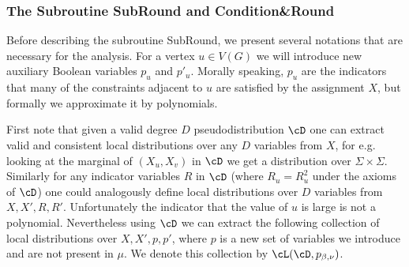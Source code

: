 \subsubsection{The Subroutine SubRound and Condition\&Round}
Before describing the subroutine SubRound, 
we present several notations that are necessary for the analysis. For a vertex $u\in V(G)$ we will introduce new auxiliary Boolean variables $p_u$ and $p'_u$.  Morally speaking, $p_u$ are the indicators
that many of the constraints adjacent to $u$ are satisfied by the assignment $X$, but formally 
we approximate it by polynomials. 

First note that given a valid degree $D$ pseudodistribution $\cD$ one can extract valid and consistent local distributions over any $D$ variables from $X$, for e.g. looking at the marginal of $(X_u,X_v)$ in $\cD$ we get a distribution over $\Sigma \times \Sigma$. Similarly for any indicator variables $R$ in $\cD$ (where $R_u = R_u^2$ under the axioms of $\cD$) one could analogously define local distributions over $D$ variables from $X,X',R,R'$. Unfortunately the indicator that the value of $u$ is large is not a polynomial. Nevertheless using $\cD$ we can extract the following collection of local distributions over $X,X',p,p'$, where $p$ is a new set of variables we introduce and are not present in $\mu$. We denote this collection by $\cL(\cD, p_{\beta,\nu})$.

